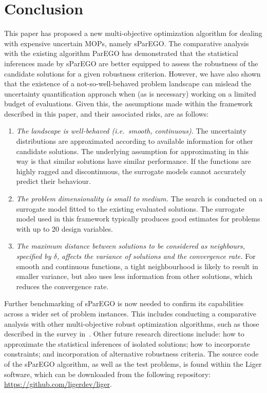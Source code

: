 \documentclass{llncs}
\begin{document}
\section{Conclusion}\label{sec:conclusion}

This paper has proposed a new multi-objective optimization algorithm for dealing with expensive uncertain MOPs, namely sParEGO. The comparative analysis with the existing algorithm ParEGO has demonstrated that the statistical inferences made by sParEGO are better equipped to assess the robustness of the candidate solutions for a given robustness criterion. However, we have also shown that the existence of a not-so-well-behaved problem landscape can  mislead the uncertainty quantification approach when (as is necessary) working on a limited budget of evaluations. Given this, the assumptions made within the framework described in this paper, and their associated risks, are as follows:
\begin{enumerate}
 \item \textit{The landscape is well-behaved (i.e.~smooth, continuous)}. The uncertainty distributions are approximated according to available information for other candidate solutions. The underlying assumption for approximating in this way is that similar solutions have similar performance. If the functions are highly ragged and discontinuous, the surrogate models cannot accurately predict their behaviour.
 
 \item \textit{The problem dimensionality is small to medium.} The search is conducted on a surrogate model fitted to the existing evaluated solutions. The surrogate model used in this framework typically produces good estimates for problems with up to 20 design variables.
 
 \item \textit{The maximum distance between solutions to be considered as neighbours, specified by $\delta$, affects the variance of solutions and the convergence rate.} For smooth and continuous functions, a tight neighbourhood is likely to result in smaller variance, but also uses less information from other solutions, which reduces the convergence rate.
\end{enumerate}

Further benchmarking of sParEGO is now needed to confirm its capabilities across a wider set of problem instances. This includes conducting a comparative analysis with other multi-objective robust optimization algorithms, such as those described in the survey in~\cite{bib:robustness_branke_2005}. Other future research directions include: how to approximate the statistical inferences of isolated solutions; how to incorporate constraints; and incorporation of alternative robustness criteria. The source code of the sParEGO algorithm, as well as the test problems, is found within the Liger software, which can be downloaded from the following repository: \url{https://github.com/ligerdev/liger}.
\end{document}
